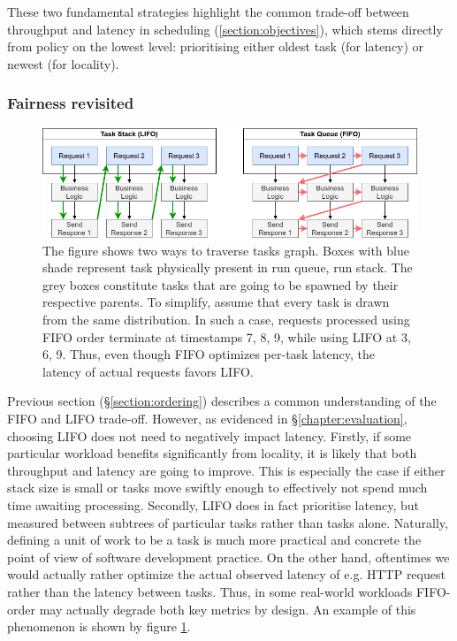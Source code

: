 \documentclass[12pt,a4paper,twoside]{report}
\begin{document}
These two fundamental strategies highlight the common trade-off between throughput and latency in scheduling (\ref{section:objectives}), which stems directly from policy on the lowest level: prioritising either oldest task (for latency) or newest (for locality). 


\subsubsection{Fairness revisited}
\label{section:fairness-revisited}

\begin{figure}
    \centering
    \includegraphics[width=1\textwidth]{FIFOLIFO.png}
    \caption{The figure shows two ways to traverse tasks graph. Boxes with blue shade represent task physically present in run queue, run stack. The grey boxes constitute tasks that are going to be spawned by their respective parents. To simplify, assume that every task is drawn from the same distribution. In such a case, requests processed using FIFO order terminate at timestamps 7, 8, 9, while using LIFO at 3, 6, 9. Thus, even though FIFO optimizes per-task latency, the latency of actual requests favors LIFO.}
   \label{fig:fifo-lifo-latency}
\end{figure}

Previous section (\S\ref{section:ordering}) describes a common understanding of the FIFO and LIFO trade-off. However,  as evidenced in \S\ref{chapter:evaluation}, choosing LIFO does not need to negatively impact latency. Firstly, if some particular workload benefits significantly from locality, it is likely that both throughput and latency are going to improve. This is especially the case if either stack size is small or tasks move swiftly enough to effectively not spend much time awaiting processing. Secondly, LIFO does in fact prioritise latency, but measured between subtrees of particular tasks rather than tasks alone. Naturally, defining a unit of work to be a task is much more practical and concrete the point of view of software development practice. On the other hand, oftentimes we would actually rather optimize the actual observed latency of e.g. HTTP request rather than the latency between tasks. Thus, in some real-world workloads FIFO-order may actually degrade both key metrics by design. An example of this phenomenon is shown by figure \ref{fig:fifo-lifo-latency}. 
\end{document}
